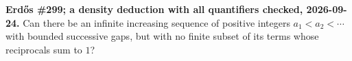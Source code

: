 \textbf{Erd\H{o}s \#299; a density deduction with all quantifiers checked, 2026-09-24.}
Can there be an infinite increasing sequence of positive integers $a_1<a_2<\cdots$ with bounded successive gaps, but with no finite subset of its terms whose reciprocals sum to $1$?
